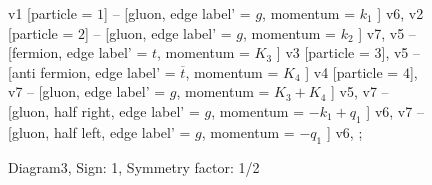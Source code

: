 \documentclass{revtex4}
\begin{document}
\begin{figure}[!htb]
\begin{center}
{    %
v1 [particle = \(1\)] -- [gluon, edge label' = \(g\), momentum = \(k_{1}\) ] v6, 
v2 [particle = \(2\)] -- [gluon, edge label' = \(g\), momentum = \(k_{2}\) ] v7, 
v5 -- [fermion, edge label' = \(t\), momentum = \(K_{3}\) ] v3 [particle = \(3\)], 
v5 -- [anti fermion, edge label' = \(\overline{t}\), momentum = \(K_{4}\) ] v4 [particle = \(4\)], 
v7 -- [gluon, edge label' = \(g\), momentum = \(K_{3} + K_{4}\) ] v5, 
v7 -- [gluon, half right, edge label' = \(g\), momentum = \(-k_{1} + q_{1}\) ] v6, 
v7 -- [gluon, half left, edge label' = \(g\), momentum = \(-q_{1}\) ] v6, 
};
\end{center}
\caption{Diagram3, Sign: 1, Symmetry factor: 1/2}
\end{figure}
\newpage
\end{document}
